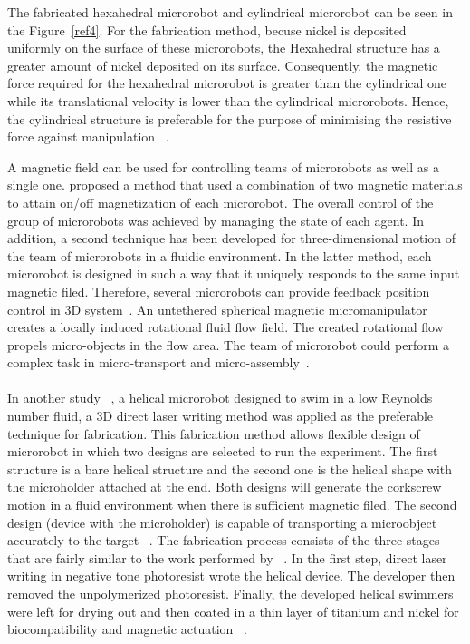 \documentclass[a4paper,11pt]{article}
\begin{document}
\begin{sloppypar}
The fabricated hexahedral microrobot and cylindrical microrobot can be seen in the Figure~\ref{ref4}.
 For the fabrication method, becuse nickel is deposited uniformly on the surface of these microrobots, the 
Hexahedral structure has a greater amount of nickel deposited on its surface. Consequently, the 
magnetic force required for the hexahedral microrobot is greater than the cylindrical one while its 
translational velocity is lower than the cylindrical microrobots. Hence, the cylindrical structure is preferable
 for the purpose of minimising the resistive force against manipulation ~\citep{kim2013fabrication}. 

A magnetic field can be used for controlling teams of microrobots as well as a single 
one. \citeauthor{kim2013fabrication} proposed a method that used a combination of two magnetic materials to 
attain on/off magnetization of each microrobot. The overall control of the group of microrobots 
was achieved by managing the state of each agent. In addition, a second technique has been 
developed for three-dimensional motion of the team of microrobots in a fluidic environment. In
 the latter method, each microrobot is designed in such a way that it uniquely responds to the 
same input magnetic filed. Therefore, several microrobots can provide feedback position control in 
3D system~\citep{kim2013fabrication}.
An untethered spherical magnetic micromanipulator creates a locally induced rotational fluid flow field. 
The created rotational flow propels micro-objects in the flow area. The team of microrobot could perform
 a complex task in micro-transport and micro-assembly~\citep{kim2013fabrication}.

\paragraph{}
In another study ~\citep{tottori2012magnetic}, a helical microrobot designed to swim in a low Reynolds number fluid, a 3D 
direct laser writing method was applied as the preferable technique for fabrication. This fabrication 
method allows flexible design of microrobot in which two designs are selected to run the experiment. 
The first structure is a bare helical structure and the second one is the
 helical shape with the microholder attached at the end. Both designs will generate the corkscrew
 motion in a fluid environment when there is sufficient magnetic filed. The second 
design (device with the microholder) is capable of transporting a microobject accurately to the 
target ~\citep{tottori2012magnetic}.
The fabrication process consists of the three stages that are fairly similar to the work
 performed by ~\citeauthor{kim2013fabrication}. In the first step, direct laser writing in negative tone photoresist 
wrote the helical device. The developer then removed the unpolymerized photoresist. Finally, the 
developed helical swimmers were left for drying out and then coated in a thin layer of titanium and 
nickel for biocompatibility and magnetic actuation ~\citep{tottori2012magnetic}.


\end{sloppypar}
\end{document}
